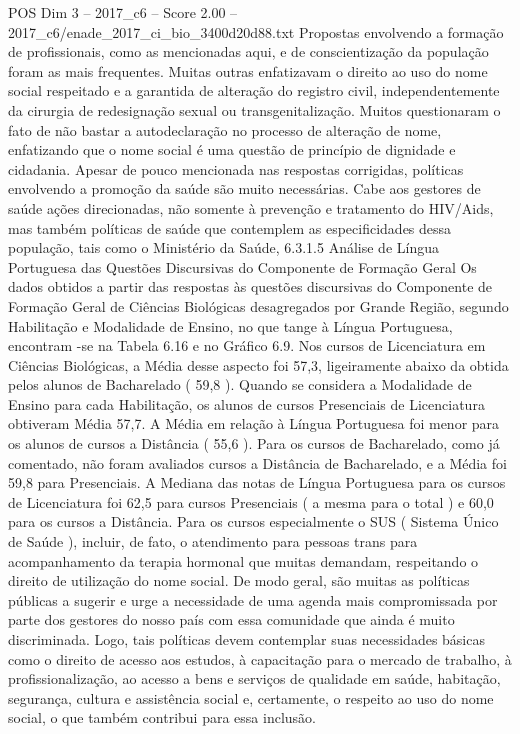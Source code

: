 \begin{textsample}{POS Dim 3 – 2017\_c6 – Score 2.00 – 2017\_c6/enade\_2017\_ci\_bio\_3400d20d88.txt}
Propostas envolvendo a formação de profissionais, como as mencionadas aqui, e de conscientização da população foram as mais frequentes.
Muitas outras enfatizavam o direito ao uso do nome social respeitado e a garantida de alteração do registro civil, independentemente da cirurgia de redesignação sexual ou transgenitalização.
Muitos questionaram o fato de não bastar a autodeclaração no processo de alteração de nome, enfatizando que o nome social é uma questão de princípio de dignidade e cidadania.
Apesar de pouco mencionada nas respostas corrigidas, políticas envolvendo a promoção da saúde são muito necessárias.
Cabe aos gestores de saúde ações direcionadas, não somente à prevenção e tratamento do HIV/Aids, mas também políticas de saúde que contemplem as especificidades dessa população, tais como o Ministério da Saúde, 6.3.1.5 Análise de Língua Portuguesa das Questões Discursivas do Componente de Formação Geral Os dados obtidos a partir das respostas às questões discursivas do Componente de Formação Geral de Ciências Biológicas desagregados por Grande Região, segundo Habilitação e Modalidade de Ensino, no que tange à Língua Portuguesa, encontram -se na Tabela 6.16 e no Gráfico 6.9.
Nos cursos de Licenciatura em Ciências Biológicas, a Média desse aspecto foi 57,3, ligeiramente abaixo da obtida pelos alunos de Bacharelado ( 59,8 ).
Quando se considera a Modalidade de Ensino para cada Habilitação, os alunos de cursos Presenciais de Licenciatura obtiveram Média 57,7.
A Média em relação à Língua Portuguesa foi menor para os alunos de cursos a Distância ( 55,6 ).
Para os cursos de Bacharelado, como já comentado, não foram avaliados cursos a Distância de Bacharelado, e a Média foi 59,8 para Presenciais.
A Mediana das notas de Língua Portuguesa para os cursos de Licenciatura foi 62,5 para cursos Presenciais ( a mesma para o total ) e 60,0 para os cursos a Distância.
Para os cursos especialmente o SUS ( Sistema Único de Saúde ), incluir, de fato, o atendimento para pessoas trans para acompanhamento da terapia hormonal que muitas demandam, respeitando o direito de utilização do nome social.
De modo geral, são muitas as políticas públicas a sugerir e urge a necessidade de uma agenda mais compromissada por parte dos gestores do nosso país com essa comunidade que ainda é muito discriminada.
Logo, tais políticas devem contemplar suas necessidades básicas como o direito de acesso aos estudos, à capacitação para o mercado de trabalho, à profissionalização, ao acesso a bens e serviços de qualidade em saúde, habitação, segurança, cultura e assistência social e, certamente, o respeito ao uso do nome social, o que também contribui para essa inclusão.

\end{textsample}
